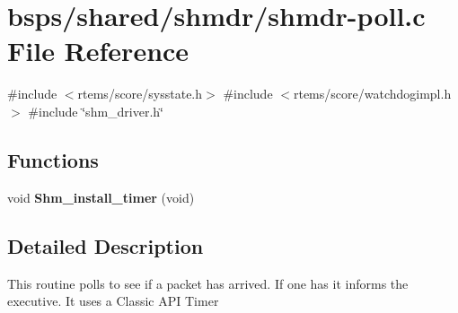 \hypertarget{shmdr-poll_8c}{}\section{bsps/shared/shmdr/shmdr-\/poll.c File Reference}
\label{shmdr-poll_8c}
{\ttfamily \#include $<$rtems/score/sysstate.\+h$>$}\newline
{\ttfamily \#include $<$rtems/score/watchdogimpl.\+h$>$}\newline
{\ttfamily \#include \char`\"{}shm\+\_\+driver.\+h\char`\"{}}\newline
\subsection*{Functions}
\begin{DoxyCompactItemize}
\item 
\mbox{\label{shmdr-poll_8c_ab4d7131cc81519e63dd11297780d6080}} 
void {\bfseries Shm\+\_\+install\+\_\+timer} (void)
\end{DoxyCompactItemize}


\subsection{Detailed Description}
This routine polls to see if a packet has arrived. If one has it informs the executive. It uses a Classic A\+PI Timer 